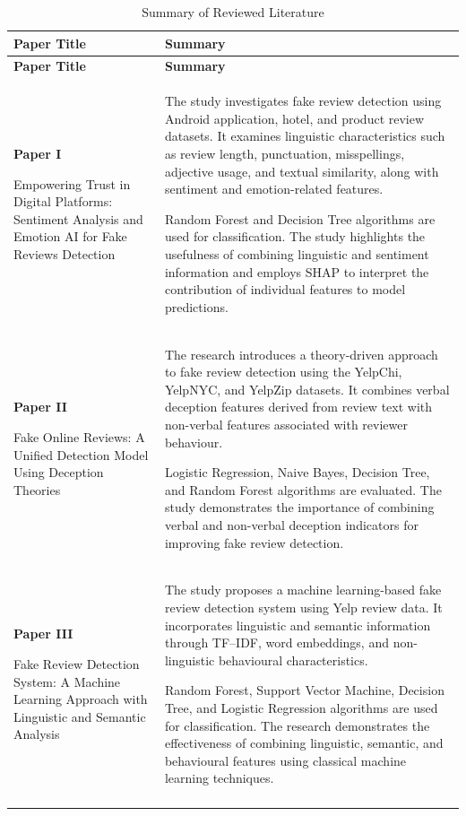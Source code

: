 \documentclass[12pt,a4paper]{report}
\begin{document}
\begin{longtable}{|
>{\raggedright\arraybackslash}p{}|
>{\raggedright\arraybackslash}p{}|}
\hline

\textbf{Paper Title} &
\textbf{Summary} \\
\hline
\endfirsthead

\hline
\textbf{Paper Title} &
\textbf{Summary} \\
\hline
\endhead

\textbf{Paper I}

Empowering Trust in Digital Platforms:
Sentiment Analysis and Emotion AI for
Fake Reviews Detection
&
The study investigates fake review detection using
Android application, hotel, and product review datasets.
It examines linguistic characteristics such as review
length, punctuation, misspellings, adjective usage,
and textual similarity, along with sentiment and
emotion-related features.

Random Forest and Decision Tree algorithms are used
for classification. The study highlights the usefulness
of combining linguistic and sentiment information
and employs SHAP to interpret the contribution of
individual features to model predictions.
\\
\hline

\textbf{Paper II}

Fake Online Reviews: A Unified Detection
Model Using Deception Theories
&
The research introduces a theory-driven approach
to fake review detection using the YelpChi,
YelpNYC, and YelpZip datasets. It combines
verbal deception features derived from review
text with non-verbal features associated with
reviewer behaviour.

Logistic Regression, Naive Bayes, Decision Tree,
and Random Forest algorithms are evaluated.
The study demonstrates the importance of
combining verbal and non-verbal deception
indicators for improving fake review detection.
\\
\hline

\textbf{Paper III}

Fake Review Detection System:
A Machine Learning Approach with
Linguistic and Semantic Analysis
&
The study proposes a machine learning-based
fake review detection system using Yelp
review data. It incorporates linguistic and
semantic information through TF--IDF,
word embeddings, and non-linguistic
behavioural characteristics.

Random Forest, Support Vector Machine,
Decision Tree, and Logistic Regression
algorithms are used for classification.
The research demonstrates the effectiveness
of combining linguistic, semantic, and
behavioural features using classical
machine learning techniques.
\\
\hline

\caption{Summary of Reviewed Literature}
\label{tab:litsummary}\\
\end{longtable}
\end{document}
